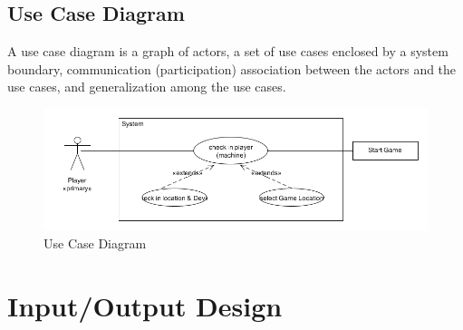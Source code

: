 \section{Use Case Diagram}
A use case diagram is a graph of actors, a set of use cases enclosed by a system boundary, communication (participation) association between the actors and the use cases, and generalization among the use cases. 

\begin{figure}[ht!]
\left
\includegraphics[width=150mm]{images/Usecases}
\caption{Use Case Diagram}
\label{overflow}
\end{figure}



%
%


\newpage
\chapter{Input/Output Design}



